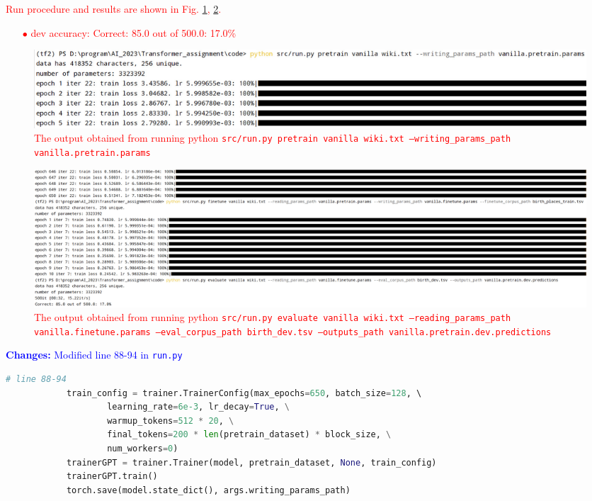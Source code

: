 \documentclass[letterpaper,12pt]{article}
\begin{document}
\begin{itemize}
		\textcolor{red}{Run procedure and results are shown in Fig. \ref{fig: 2.f.process.1}, \ref{fig: 2.f.result.1}.
		\begin{itemize}
			\item [$ \bullet $] dev accuracy: Correct: 85.0 out of 500.0: 17.0\%
		\end{itemize}
		\begin{figure}[htbp] 
			\centering 
			\includegraphics[width=0.9\linewidth]{picture/2.f.process.1}
			\captionsetup{font=small}
			\captionsetup{font=scriptsize}
			\caption{
				\label{fig: 2.f.process.1} %
				The output obtained from running python \texttt{src/run.py pretrain vanilla wiki.txt --writing\_params\_path vanilla.pretrain.params}
			}
		\end{figure}
		\begin{figure}[htbp] 
			\centering 
			\includegraphics[width=0.7\linewidth]{picture/2.f.result.1}
			\captionsetup{font=small}
			\captionsetup{font=scriptsize}
			\caption{
				\label{fig: 2.f.result.1} %
				The output obtained from running python \texttt{src/run.py evaluate vanilla wiki.txt --reading\_params\_path vanilla.finetune.params --eval\_corpus\_path birth\_dev.tsv --outputs\_path vanilla.pretrain.dev.predictions}
			}
		\end{figure}
		}
		
		\textcolor{blue}{\textbf{Changes:} Modified line 88-94 in \texttt{run.py}} 
		\begin{lstlisting}[language=python, basicstyle=\small\ttfamily]
			# line 88-94
			train_config = trainer.TrainerConfig(max_epochs=650, batch_size=128, \ 
					learning_rate=6e-3, lr_decay=True, \
					warmup_tokens=512 * 20, \
					final_tokens=200 * len(pretrain_dataset) * block_size, \
					num_workers=0)
			trainerGPT = trainer.Trainer(model, pretrain_dataset, None, train_config)
			trainerGPT.train()
			torch.save(model.state_dict(), args.writing_params_path)
		\end{lstlisting}
		

\end{itemize}
\end{document}
